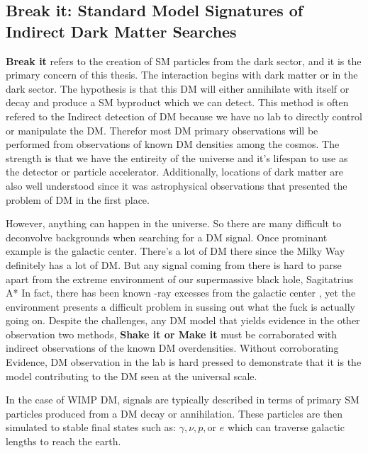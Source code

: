 
\subsection{Break it: Standard Model Signatures of Indirect Dark Matter Searches\label{sec:break_it}}

\textbf{Break it} refers to the creation of SM particles from the dark sector, and it is the primary concern of this thesis.
The interaction begins with dark matter or in the dark sector.
The hypothesis is that this DM will either annihilate with itself or decay and produce a SM byproduct which we can detect.
This method is often refered to the Indirect detection of DM because we have no lab to directly control or manipulate the DM.
Therefor most DM primary observations will be performed from observations of known DM densities among the cosmos.
The strength is that we have the entireity of the universe and it's lifespan to use as the detector or particle accelerator.
Additionally, locations of dark matter are also well understood since it was astrophysical observations that presented the problem of DM in the first place.

However, anything can happen in the universe.
So there are many difficult to deconvolve backgrounds when searching for a DM signal.
Once prominant example is the galactic center.
There's a lot of DM there since the Milky Way definitely has a lot of DM.
But any signal coming from there is hard to parse apart from the extreme environment of our supermassive black hole, Sagitatrius A*
In fact, there has been known \textgamma -ray excesses from the galactic center \ns, yet the environment presents a difficult problem in sussing out what the fuck is actually going on.
Despite the challenges, any DM model that yields evidence in the other observation two methods, \textbf{Shake it or Make it} must be corraborated with indirect observations of the known DM overdensities.
Without corroborating Evidence, DM observation in the lab is hard pressed to demonstrate that it is the model contributing to the DM seen at the universal scale.

In the case of WIMP DM, signals are typically described in terms of primary SM particles produced from a DM decay or annihilation.
These particles are then simulated to stable final states such as: $\gamma, \nu, p, \text{or } e$ which can traverse galactic lengths to reach the earth.


